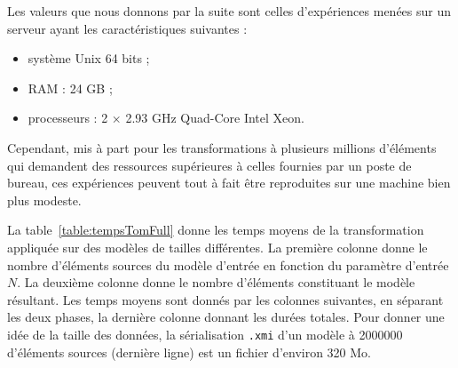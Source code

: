 Les valeurs que nous donnons par la suite sont celles d'expériences menées sur
un serveur ayant les caractéristiques suivantes :
\begin{itemize}
  \item système Unix 64 bits ;
  \item RAM : 24 GB ;
  \item processeurs : 2 $\times$ \num{2.93} GHz Quad-Core Intel Xeon.
\end{itemize}
Cependant, mis à part pour les transformations à plusieurs millions
d'éléments qui demandent des ressources supérieures à celles fournies par un
poste de bureau, ces expériences peuvent tout à fait être reproduites sur une
machine bien plus modeste.

La table~\ref{table:tempsTomFull} donne les temps moyens de la transformation
appliquée sur des modèles de tailles différentes. La première colonne donne le
nombre d'éléments sources du modèle d'entrée en fonction du paramètre d'entrée
$N$. La deuxième colonne donne le nombre d'éléments constituant le modèle
résultant. Les temps moyens sont donnés par les colonnes suivantes, en séparant
les deux phases, la dernière colonne donnant les durées totales.  Pour donner
une idée de la taille des données, la sérialisation \texttt{.xmi} d'un modèle à
\num{2000000} d'éléments sources (dernière ligne) est un fichier d'environ
\num{320} Mo.


%


